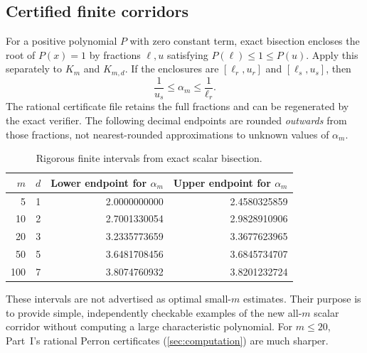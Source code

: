 \documentclass[11pt,a4paper]{article}
\theoremstyle{definition}\newaliascnt{definition}{theorem}
\theoremstyle{remark}\newaliascnt{remark}{theorem}
\begin{document}
\subsection{Certified finite corridors}
For a positive polynomial $P$ with zero constant term, exact bisection
encloses the root of $P(x)=1$ by fractions $\ell,u$ satisfying
$P(\ell)\le1\le P(u)$. Apply this separately to $K_m$ and $K_{m,d}$. If the
enclosures are $[\ell_r,u_r]$ and $[\ell_s,u_s]$, then
\begin{equation}
 \frac1{u_s}\le\alpha_m\le\frac1{\ell_r}.
 \label{crem:eq:certified-corridor}
\end{equation}
The rational certificate file
 retains the full
fractions and can be regenerated by the exact verifier. The following
decimal endpoints are rounded \emph{outwards} from those fractions, not
nearest-rounded approximations to unknown values of $\alpha_m$.
\begin{table}[htbp]
\centering\small
\caption{Rigorous finite intervals from exact scalar bisection.}
\label{crem:tab:certified}
\begin{tabular}{rrrr}
\toprule
$m$ & $d$ & Lower endpoint for $\alpha_m$ & Upper endpoint for $\alpha_m$\\
\midrule
5 &1 &2.0000000000 &2.4580325859\\
10 &2 &2.7001330054 &2.9828910906\\
20 &3 &3.2335773659 &3.3677623965\\
50 &5 &3.6481708456 &3.6845734707\\
100 &7 &3.8074760932 &3.8201232724\\
\bottomrule
\end{tabular}
\end{table}
These intervals are not advertised as optimal small-$m$ estimates. Their
purpose is to provide simple, independently checkable examples of the new
all-$m$ scalar corridor without computing a large characteristic polynomial.
For $m\le20$, Part~I's rational Perron certificates (\cref{sec:computation})
are much sharper.
\end{document}
